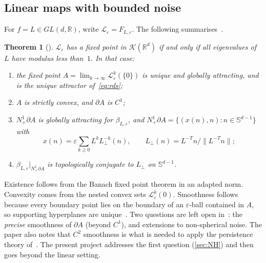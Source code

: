 \documentclass[11pt,a4paper]{article}
\newtheorem{theorem}{Theorem}[section]
\theoremstyle{definition}
\theoremstyle{remark}
\newcommand{\R}{\mathbb{R}}
\newcommand{\eps}{\varepsilon}
\newcommand{\Sph}{\mathbb{S}}
\newcommand{\Nb}{N^1_+\partial A}
\newcommand{\Lperp}{L_\perp}
\begin{document}
\subsection{Linear maps with bounded noise}
For $f=L\in GL(d,\R)$, write $\mathcal{L}_\eps=F_{L,\eps}$. The following summarises~\cite{LRT23}.
\begin{theorem}[\cite{LRT23}]\label{thm:LRT}
$\mathcal{L}_\eps$ has a fixed point in $\mathcal{K}(\R^d)$ if and only if all eigenvalues of $L$ have modulus less
than~$1$. In that case:
\begin{enumerate}[label=(\roman*)]
  \item the fixed point $A=\lim_{k\to\infty}\mathcal{L}_\eps^k(\{0\})$ is unique and globally attracting, and is the
  unique attractor of~\eqref{eq:rds};
  \item $A$ is strictly convex, and $\partial A$ is $C^1$;
  \item $\Nb$ is globally attracting for $\beta_{L,\eps}$, and $\Nb=\{(x(n),n):n\in\Sph^{d-1}\}$ with
  \[ x(n)=\eps\sum_{k\ge0}L^k\Lperp^{-k}(n),\qquad \Lperp(n)=L^{-T}n/\|L^{-T}n\|;\]
  \item $\beta_{L,\eps}|_{\Nb}$ is topologically conjugate to $\Lperp$ on $\Sph^{d-1}$.
\end{enumerate}
\end{theorem}
Existence follows from the Banach fixed point theorem in an adapted norm. Convexity comes from the nested convex sets
$\mathcal{L}^k_\eps(0)$. Smoothness follows because every boundary point lies on the boundary of an $\eps$-ball contained in
$A$, so supporting hyperplanes are unique~\cite{Sch14}. Two questions are left open in~\cite{LRT23}: the \emph{precise}
smoothness of $\partial A$ (beyond $C^1$), and extensions to non-spherical noise. The paper also notes that $C^2$ smoothness is what is needed to apply the persistence theory of~\cite{KLRTTT23}. The
present project addresses the first question (\cref{sec:NH}) and then goes beyond the linear setting.
\end{document}
